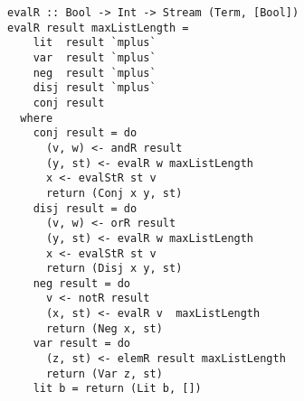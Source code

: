 

\begin{figure}[!t]
  \centering
  \begin{minipage}{0.49\textwidth}
    \begin{lstlisting}[label={eval_r}, caption={Functional implementation of the direction \lstinline{evalo out out in}}, captionpos=b, frame=tb]
evalR :: Bool -> Int -> Stream (Term, [Bool])
evalR result maxListLength =
    lit  result `mplus`
    var  result `mplus`
    neg  result `mplus`
    disj result `mplus`
    conj result
  where
    conj result = do
      (v, w) <- andR result
      (y, st) <- evalR w maxListLength
      x <- evalStR st v
      return (Conj x y, st)
    disj result = do
      (v, w) <- orR result
      (y, st) <- evalR w maxListLength
      x <- evalStR st v
      return (Disj x y, st)
    neg result = do
      v <- notR result
      (x, st) <- evalR v  maxListLength
      return (Neg x, st)
    var result = do
      (z, st) <- elemR result maxListLength
      return (Var z, st)
    lit b = return (Lit b, [])
    \end{lstlisting}
  \end{minipage}
\end{figure}

